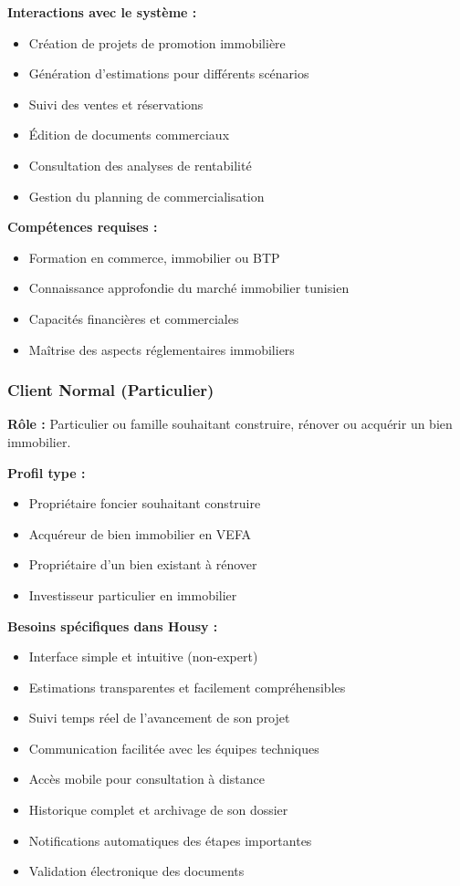 \textbf{Interactions avec le système :}
\begin{itemize}
    \item Création de projets de promotion immobilière
    \item Génération d'estimations pour différents scénarios
    \item Suivi des ventes et réservations
    \item Édition de documents commerciaux
    \item Consultation des analyses de rentabilité
    \item Gestion du planning de commercialisation
\end{itemize}

\textbf{Compétences requises :}
\begin{itemize}
    \item Formation en commerce, immobilier ou BTP
    \item Connaissance approfondie du marché immobilier tunisien
    \item Capacités financières et commerciales
    \item Maîtrise des aspects réglementaires immobiliers
\end{itemize}

\subsubsection{Client Normal (Particulier)}

\textbf{Rôle :} Particulier ou famille souhaitant construire, rénover ou acquérir un bien immobilier.

\textbf{Profil type :}
\begin{itemize}
    \item Propriétaire foncier souhaitant construire
    \item Acquéreur de bien immobilier en VEFA
    \item Propriétaire d'un bien existant à rénover
    \item Investisseur particulier en immobilier
\end{itemize}

\textbf{Besoins spécifiques dans Housy :}
\begin{itemize}
    \item Interface simple et intuitive (non-expert)
    \item Estimations transparentes et facilement compréhensibles
    \item Suivi temps réel de l'avancement de son projet
    \item Communication facilitée avec les équipes techniques
    \item Accès mobile pour consultation à distance
    \item Historique complet et archivage de son dossier
    \item Notifications automatiques des étapes importantes
    \item Validation électronique des documents
\end{itemize}

